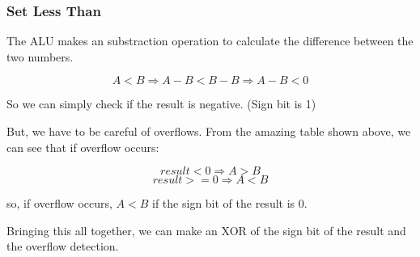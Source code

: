\documentclass[11pt,a4paper]{article}
\begin{document}
\subsubsection*{Set Less Than}

The ALU makes an substraction operation to calculate the difference between the two numbers.

\[
    A < B \Rightarrow A - B < B - B \Rightarrow A - B < 0
\]

So we can simply check if the result is negative. (Sign bit is 1)

But, we have to be careful of overflows. From the amazing table shown above, we can see
that if overflow occurs:

\[
    result < 0 \Rightarrow A > B
\]
\[
    result >= 0 \Rightarrow A < B
\]

so, if overflow occurs, $A < B$ if the sign bit of the result is 0.

Bringing this all together, we can make an XOR of the sign bit of the result and the overflow detection.

\end{document}
